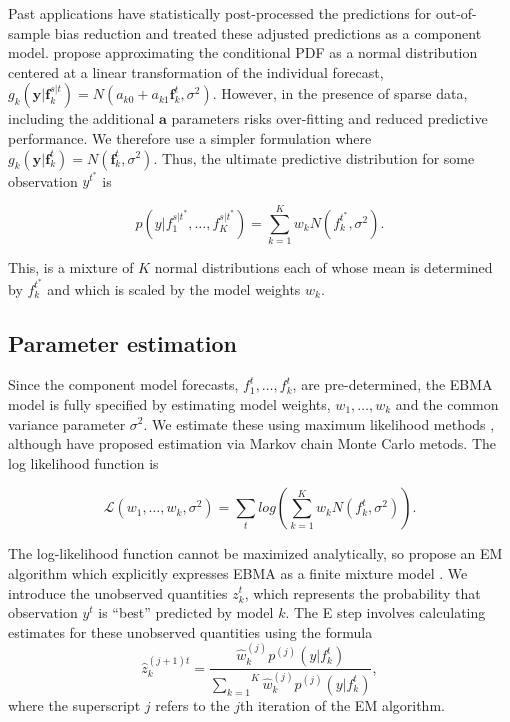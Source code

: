 \documentclass[12pt,fullpage,endnotes]{article}
\begin{document}
Past applications have statistically post-processed the predictions for
out-of-sample bias reduction and treated these adjusted predictions as a
component model. \citet{Raftery:2005} propose approximating the
conditional PDF as a normal distribution centered at a linear
transformation of the individual forecast,
$g_k(\mathbf{y}|\mathbf{f}_k^{s|t}) = N(a_{k0} +
a_{k1}\mathbf{f}_k^{t}, \sigma^2)$. However, in the presence of sparse
data, including the additional $\mathbf{a}$ parameters risks
over-fitting and reduced predictive performance.  We therefore use a
simpler formulation where $g_k(\mathbf{y}|\mathbf{f}_k^{t}) =
N(\mathbf{f}_k^{t}, \sigma^2)$.  Thus, the ultimate predictive
distribution for some observation $y^{t^\ast}$ is 

\begin{equation}
\label{pdf}p(y|f_1^{s|t^\ast},
\ldots, f_K^{s|t^\ast}) = \overset{K}{\underset{k=1}{\sum}} w_k
N(f_k^{t^\ast}, \sigma^2).
\end{equation}

\noindent This, is a mixture of $K$ normal distributions each of whose mean is
determined by $f_k^{t^\ast}$ and which is scaled by the model weights
$w_k$.

\subsection{Parameter estimation}

Since the component model forecasts, $f^t_1, \ldots, f^t_k$, are
pre-determined, the EBMA model is fully specified by estimating model
weights, $w_1, \ldots, w_k$ and the common variance parameter
$\sigma^2$.  We estimate these using maximum likelihood methods
\citep{Raftery:2005}, although \citet{Vrugt:2008} have proposed
estimation via Markov chain Monte Carlo metods.  The log likelihood
function is

\begin{equation}
\mathcal{L}(w_1, \ldots, w_k, \sigma^2)=\sum_tlog\left(\sum_{k=1}^Kw_kN(f^t_k, \sigma^2) \right).
\end{equation}


\noindent The log-likelihood function cannot be maximized analytically, so
\citet{Raftery:2005} propose an EM algorithm which explicitly
expresses EBMA as a finite mixture model \cite{mclachlan:peel:2000,imai:tingley:2012}.  We introduce the unobserved quantities
$z_k^t$, which represents the probability that observation $y^t$ is
``best'' predicted by model $k$.  The E step involves calculating
estimates for these unobserved quantities using the formula
\begin{equation}
\label{E-step}
\hat{z}^{(j+1)t}_{k} = \frac{\hat{w}^{(j)}_k
p^{(j)}(y|f_{k}^{t})}{\overset{K}{\underset{k=1}{\sum}}\hat{w}^{(j)}_kp^{(j)}(y|f_{k}^{t})},
\end{equation}
\noindent where the superscript $j$ refers to the $j$th iteration of
the EM algorithm.
\end{document}
